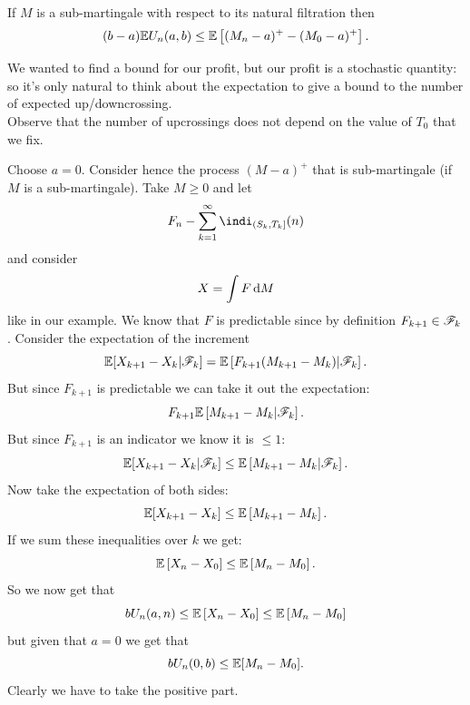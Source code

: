 \documentclass{report}
\begin{document}
\begin{proposition}
	If $M$ is a sub-martingale with respect to its natural filtration then 
	\begin{equation*}
		(b-a)\mathbb{E} U_{n}(a,b)\leq\mathbb{E}\left[(M_{n}-a)^{+}-(M_{0}-a)^{+}\right].
	\end{equation*}
\end{proposition}
We wanted to find a bound for our profit, but our profit is a stochastic quantity: so it's only natural to think about the expectation to give a bound to the number of expected up/downcrossing.\\
Observe that the number of upcrossings does not depend on the value of $T_0$ that we fix.
\begin{fancyproof}
	Choose $a=0$. Consider hence the process $(M-a)^{+}$ that is sub-martingale (if $M$ is a sub-martingale). Take $M\geq 0$ and let 
	\begin{equation*}
		F_{n}-\sum_{k=1}^{\infty}\indi_{(S_{k},T_{k}]}(n)
	\end{equation*}
	and consider 
	\begin{equation*}
		X=\int F\mathop{}\!\mathrm{d} M
	\end{equation*}
	like in our example. We know that $F$ is predictable since by definition $F_{k+1}\in\mathscr{F}_{k}$. Consider the expectation of the increment
	\begin{equation*}
		\mathbb{E}[X_{k+1}-X_{k}|\mathscr{F}_{k}]=\mathbb{E}\left[F_{k+1}(M_{k+1}-M_{k})|\mathscr{F}_{k}\right].
	\end{equation*}
	But since $F_{k+1}$ is predictable we can take it out the expectation:
	\begin{equation*}
		F_{k+1}\mathbb{E}\left[M_{k+1}-M_{k}|\mathscr{F}_{k}\right].
	\end{equation*}
	But since $F_{k+1}$ is an indicator we know it is $\leq1$:
	\begin{equation*}
			\mathbb{E}[X_{k+1}-X_{k}|\mathscr{F}_{k}]\leq\mathbb{E}\left[M_{k+1}-M_{k}|\mathscr{F}_{k}\right].
	\end{equation*}
	Now take the expectation of both sides:
	\begin{equation*}
		\mathbb{E}[X_{k+1}-X_{k}]\leq\mathbb{E}\left[M_{k+1}-M_{k}\right].
	\end{equation*}
	If we sum these inequalities over $k$ we get:
	\begin{equation*}
		\mathbb{E}\left[X_{n}-X_{0}\right]\leq\mathbb{E}\left[M_{n}-M_{0}\right].
	\end{equation*}
	So we now get that
	\begin{equation*}
		bU_{n}(a,n)\leq\mathbb{E}\left[X_{n}-X_{0}\right]\leq\mathbb{E}\left[M_{n}-M_{0}\right]
	\end{equation*}
	but given that $a=0$ we get that
	\begin{equation*}
		bU_{n}(0,b)\leq\mathbb{E}[M_{n}-M_{0}].
	\end{equation*}
	Clearly we have to take the positive part.
\end{fancyproof}
\end{document}
